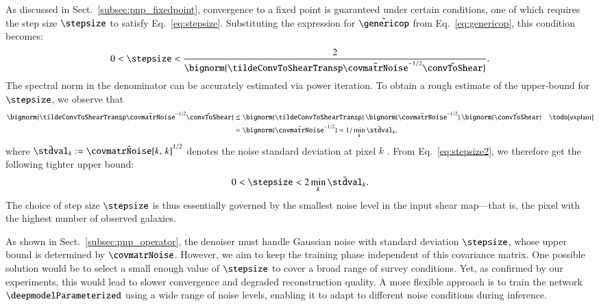 \documentclass{aa}
\begin{document}
As discussed in Sect.~\ref{subsec:pnp_fixedpoint}, convergence to a fixed point is guaranteed under certain conditions, one of which requires the step size $\stepsize$ to satisfy Eq.~\eqref{eq:stepsize}. Substituting the expression for $\tilde\genericop$ from Eq.~\eqref{eq:genericop}, this condition becomes:
\begin{equation}
    0 < \stepsize < \frac{2}{\bignorm{\tildeConvToShearTransp\tilde\covmatrNoise^{-1/2}\tilde\convToShear}}.
\label{eq:stepsize2}
\end{equation}
The spectral norm in the denominator can be accurately estimated via power iteration. To obtain a rough estimate of the upper-bound for $\stepsize$, we observe that
\begin{align}
    \bignorm{\tildeConvToShearTransp\tilde\covmatrNoise^{-1/2}\tilde\convToShear}
        &\leq \bignorm{\tildeConvToShearTransp}\, \bignorm{\tilde\covmatrNoise^{-1/2}}\, \bignorm{\tilde\convToShear} & \mbox{\todo[explain]} \\
        &= \bignorm{\tilde\covmatrNoise^{-1/2}} = 1 / \min_k \tilde\stdval_k,
\end{align}
where $\tilde\stdval_k := \tilde\covmatrNoise[k,\, k]^{1/2}$ denotes the noise standard deviation at pixel $k$ \tocheck. From Eq.~\eqref{eq:stepsize2}, we therefore get the following tighter upper bound:
\begin{equation}
    0 < \stepsize < 2 \min_k \tilde\stdval_k.
\label{eq:stepsize3}
\end{equation}
The choice of step size $\stepsize$ is thus essentially governed by the smallest noise level in the input shear map---that is, the pixel with the highest number of observed galaxies.

As shown in Sect.~\ref{subsec:pnp_operator}, the denoiser must handle Gaussian noise with standard deviation $\stepsize$, whose upper bound is determined by $\covmatrNoise$. However, we aim to keep the training phase independent of this covariance matrix. One possible solution would be to select a small enough value of $\stepsize$ to cover a broad range of survey conditions. Yet, as confirmed by our experiments, this would lead to slower convergence and degraded reconstruction quality. A more flexible approach is to train the network $\deepmodelParameterized$ using a wide range of noise levels, enabling it to adapt to different noise conditions during inference.
\end{document}
